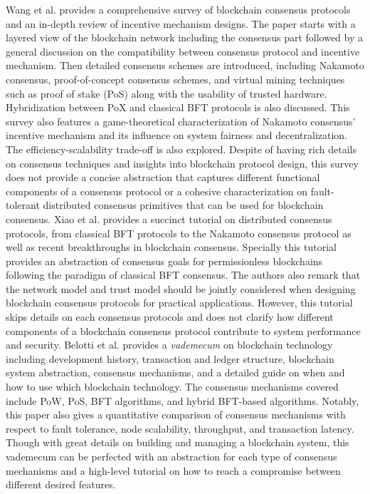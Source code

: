 {\color{\rcolor}
Wang et al.  provides a comprehensive survey of blockchain consensus protocols and an in-depth review of incentive mechanism designs. The paper starts with a layered view of the blockchain network including the consensus part followed by a general discussion on the compatibility between consensus protocol and incentive mechanism. Then detailed consensus schemes are introduced, including Nakamoto consensus, proof-of-concept consensus schemes, and virtual mining techniques such as proof of stake (PoS) along with the usability of trusted hardware. Hybridization between PoX and classical BFT protocols is also discussed. This survey also features a game-theoretical characterization of Nakamoto consensus' incentive mechanism and its influence on system fairness and decentralization. The efficiency-scalability trade-off is also explored.
Despite of having rich details on consensus techniques and insights into blockchain protocol design, this survey does not provide a concise abstraction that captures different functional components of a consensus protocol or a cohesive characterization on fault-tolerant distributed consensus primitives that can be used for blockchain consensus. 
}
Xiao et al.  provides a succinct tutorial on distributed consensus protocols, from classical BFT protocols to the Nakamoto consensus protocol as well as recent breakthroughs in blockchain consensus. Specially this tutorial provides an abstraction of consensus goals for permissionless blockchains following the paradigm of classical BFT consensus. 
{\color{\rcolor}
The authors also remark that the network model and trust model should be jointly considered when designing blockchain consensus protocols for practical applications. However, this tutorial skips details on each consensus protocols and does not clarify how different components of a blockchain consensus protocol contribute to system performance and security.
}
{\color{\rcolor}
Belotti et al.  provides a \emph{vademecum} on blockchain technology including development history, transaction and ledger structure, blockchain system abstraction, consensus mechanisms, and a detailed guide on when and how to use which blockchain technology. The consensus mechanisms covered include PoW, PoS, BFT algorithms, and hybrid BFT-based algorithms. Notably, this paper also gives a quantitative comparison of consensus mechanisms with respect to fault tolerance, node scalability, throughput, and transaction latency. Though with great details on building and managing a blockchain system, this vademecum can be perfected with an abstraction for each type of consensus mechanisms and a high-level tutorial on how to reach a compromise between different desired features.
}


